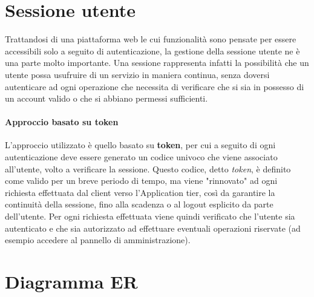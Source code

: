 \section{Sessione utente}
Trattandosi di una piattaforma web le cui funzionalità sono pensate per essere
accessibili solo a seguito di autenticazione, la gestione della sessione utente
ne è una parte molto importante. Una sessione rappresenta infatti la possibilità
che un utente possa usufruire di un servizio in maniera continua, senza doversi
autenticare ad ogni operazione che necessita di verificare che si sia in possesso
di un account valido o che si abbiano permessi sufficienti.

\paragraph{Approccio basato su token}
L'approccio utilizzato è quello basato su \textbf{token}, per cui a seguito
di ogni autenticazione deve essere generato un codice univoco che viene associato
all'utente, volto a verificare la sessione. Questo codice, detto \textit{token}, è
definito come valido per un breve periodo di tempo, ma viene "rinnovato" ad ogni
richiesta effettuata dal client verso l'Application tier, così da garantire la
continuità della sessione, fino alla scadenza o al logout esplicito da parte
dell'utente.
Per ogni richiesta effettuata viene quindi verificato che l'utente sia autenticato
e che sia autorizzato ad effettuare eventuali operazioni riservate (ad esempio
accedere al pannello di amministrazione).


\section{Diagramma ER}

